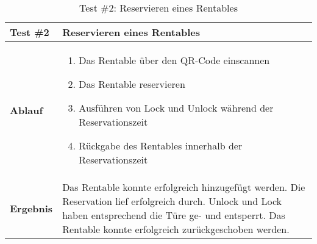 \begin{table}[H]
\centering
\caption{Test \#2: Reservieren eines Rentables}
\label{my-label}
\begin{tabular}{@{}L{1.6cm}L{11cm}@{}}
\toprule
\textbf{Test \#2}
& Reservieren eines Rentables
\\ \midrule
\textbf{Ablauf}
& 
\begin{enumerate}
    \item Das Rentable über den QR-Code einscannen
    \item Das Rentable reservieren
    \item Ausführen von Lock und Unlock während der Reservationszeit
    \item Rückgabe des Rentables innerhalb der Reservationszeit
\end{enumerate}
\\ \midrule
\textbf{Ergebnis}
& Das Rentable konnte erfolgreich hinzugefügt werden. Die Reservation lief erfolgreich durch. Unlock und Lock haben entsprechend die Türe ge- und entsperrt. Das Rentable konnte erfolgreich zurückgeschoben werden.
\\ \bottomrule
\end{tabular}
\end{table}